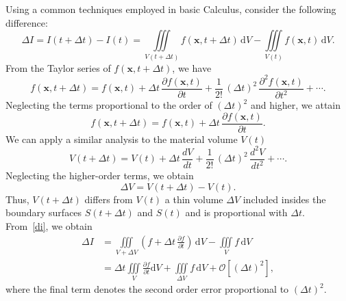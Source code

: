 \documentclass[12pt,a4paper]{report}
\begin{document}
Using a common techniques employed in basic Calculus, consider the following difference:
\begin{equation}
\Delta I = I(t + \Delta t) - I(t) = \iiint\limits_{V(t+\Delta t)} f(\mathbf{x}, t + \Delta t) \, \mathrm{d}V - \iiint\limits_{V(t)} f(\mathbf{x}, t) \, \mathrm{d}V. \label{di}
\end{equation}
From the Taylor series of $f(\mathbf{x},t+ \Delta t)$, we have
\begin{equation}
f(\mathbf{x}, t + \Delta t) = f(\mathbf{x}, t) + \Delta t \, \frac{\partial f(\mathbf{x}, t)}{\partial t} + 
                              \frac{1}{2!} \, (\Delta t)^2 \,\frac{\partial^2 f(\mathbf{x}, t)}{\partial t^2} + \cdots.
\end{equation}
Neglecting the terms proportional to the order of $(\Delta t)^2$ and higher, we attain
\begin{equation}
f(\mathbf{x}, t + \Delta t) = f(\mathbf{x}, t) + \Delta t \, \frac{\partial f(\mathbf{x}, t)}{\partial t}.
\end{equation}
We can apply a similar analysis to the material volume $V(t)$
\begin{equation}
V(t + \Delta t) = V(t) + \Delta t \, \frac{dV}{dt} + \frac{1}{2!} \, (\Delta t)^2 \, \frac{d^2V}{dt^2} + \cdots.
\end{equation}
Neglecting the higher-order terms, we obtain
\begin{equation}
\Delta V = V(t + \Delta t) - V(t).
\end{equation}
Thus, $V(t + \Delta t)$ differs from $V(t)$ a thin volume $\Delta V$ included insides the boundary surfaces $S(t + \Delta t)$ and $S(t)$ and is proportional with $\Delta t$.
From~\eqref{di}, we obtain
\begin{align}
\Delta I &= \iiint\limits_{V + \Delta V} \left(f + \Delta t \, \frac{\partial f}{\partial t} \right) \, \mathrm{d}V - \iiint\limits_{V} f \, \mathrm{d}V \\
         &= \Delta t \iiint\limits_{V} \frac{\partial f}{\partial t} \mathrm{d}V + \iiint\limits_{\Delta V} f \, \mathrm{d} V + {\mathcal{O}} \left[(\Delta t)^2 \right],
\end{align}
where the final term denotes the second order error proportional to $(\Delta t)^2$. 
\end{document}
